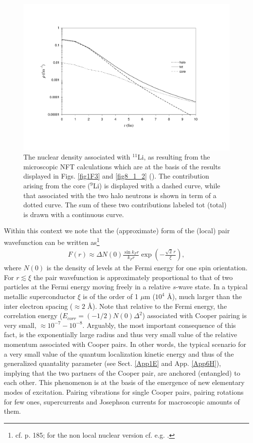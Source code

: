 \begin{figure}
\centerline{\includegraphics*[width=15cm,angle=0]{nutshell/figs/fig3_2_2.pdf}}
\caption{The nuclear density associated with $^{11}$Li, as resulting from the microscopic NFT calculations which are at the basis of the results displayed in Figs. \ref{fig1F3} and \ref{fig8_1_2} (\cite{Barranco:01}). The contribution arising from the core ($^{9}$Li) is displayed with a dashed curve, while that associated with the two halo neutrons is shown in term of a dotted curve. The sum of these two contributions  labeled tot (total) is drawn with a continuous curve.}\label{fig3.2.2}
\end{figure}
Within this context we note that the (approximate) form of the (local) pair wavefunction can be written as\footnote{cf. \cite{Leggett:06} p. 185; for the non local nuclear version cf. e.g. \cite{Broglia:83c}.}
\begin{align}\label{eq4.3.2}
F(r)\approx\Delta N(0)\frac{\sin k_F r}{k_Fr}\exp\left(-\frac{\sqrt{2}\,r}{\xi}\right),
\end{align}
where $N(0)$ is the density of levels at the Fermi energy for one spin orientation. For $r\lesssim\xi$ the pair wavefunction is approximately proportional to that of two particles at the Fermi energy moving freely in a relative $s$-wave state. In a typical metallic superconductor $\xi$ is of the order of 1 $\mu$m ($10^4$ \AA), much larger than the inter electron spacing ($\approx 2$ \AA). Note that relative to the Fermi energy, the correlation energy ($E_{corr}=(-1/2)N(0)\Delta^2$) associated with Cooper pairing is very small, $\approx 10^{-7}-10^{-8}$. Arguably, the most important consequence of this fact, is the exponentially large radius and thus very small value of the relative momentum associated with Cooper pairs. In other words, the typical scenario for a very small value of the quantum localization kinetic energy and thus of the generalized quantality parameter (see Sect. \ref{App1E} and App. \ref{App6H}), implying that the two partners of the Cooper pair, are  anchored (entangled) to each other. This phenomenon is at the basis  of the emergence of new elementary modes of excitation. Pairing vibrations for single Cooper pairs, pairing rotations for few ones, supercurrents and Josephson currents for macroscopic amounts of them.



